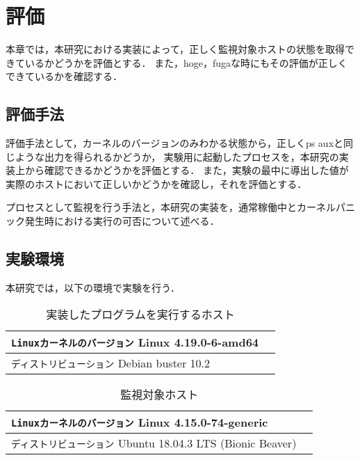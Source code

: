 \chapter{評価}
\label{chap:evaluation}

本章では，本研究における実装によって，正しく監視対象ホストの状態を取得できているかどうかを評価とする．
また，hoge，fugaな時にもその評価が正しくできているかを確認する．

\section{評価手法}

評価手法として，カーネルのバージョンのみわかる状態から，正しくps auxと同じような出力を得られるかどうか，
実験用に起動したプロセスを，本研究の実装上から確認できるかどうかを評価とする．
また，実験の最中に導出した値が実際のホストにおいて正しいかどうかを確認し，それを評価とする．

プロセスとして監視を行う手法と，本研究の実装を，通常稼働中とカーネルパニック発生時における実行の可否について述べる．

\section{実験環境}

本研究では，以下の環境で実験を行う．

\begin{table}[htbp]
    \caption{実装したプログラムを実行するホスト}
    \begin{center}
      \begin{tabular}{ll}
      \hline
      \verb|Linuxカーネルのバージョン| Linux 4.19.0-6-amd64 \\
      \hline
      \verb|ディストリビューション| Debian buster 10.2 \\
      \hline
      \end{tabular}
    \end{center}
  \end{table}

  \begin{table}[htbp]
    \caption{監視対象ホスト}
    \begin{center}
      \begin{tabular}{ll}
      \hline
      \verb|Linuxカーネルのバージョン| Linux 4.15.0-74-generic \\
      \hline
      \verb|ディストリビューション| Ubuntu 18.04.3 LTS (Bionic Beaver) \\
      \hline
      \end{tabular}
    \end{center}
  \end{table}

